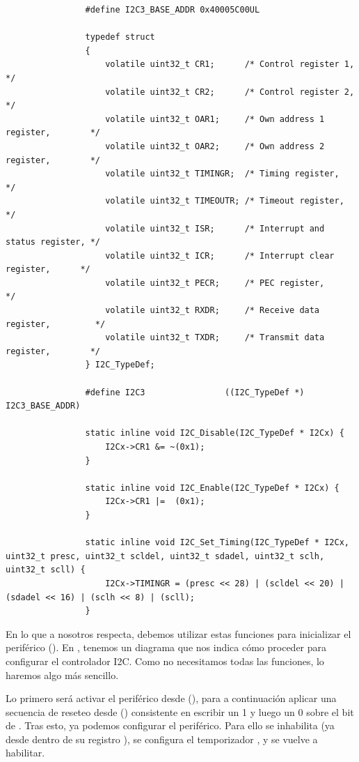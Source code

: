 \documentclass[../main.tex]{subfiles}
\begin{document}
            \begin{lstlisting}
                #define I2C3_BASE_ADDR 0x40005C00UL

                typedef struct
                {
                    volatile uint32_t CR1;      /* Control register 1,            */
                    volatile uint32_t CR2;      /* Control register 2,            */
                    volatile uint32_t OAR1;     /* Own address 1 register,        */
                    volatile uint32_t OAR2;     /* Own address 2 register,        */
                    volatile uint32_t TIMINGR;  /* Timing register,               */
                    volatile uint32_t TIMEOUTR; /* Timeout register,              */
                    volatile uint32_t ISR;      /* Interrupt and status register, */
                    volatile uint32_t ICR;      /* Interrupt clear register,      */
                    volatile uint32_t PECR;     /* PEC register,                  */
                    volatile uint32_t RXDR;     /* Receive data register,         */
                    volatile uint32_t TXDR;     /* Transmit data register,        */
                } I2C_TypeDef;

                #define I2C3				((I2C_TypeDef *) I2C3_BASE_ADDR)
                
                static inline void I2C_Disable(I2C_TypeDef * I2Cx) {
                    I2Cx->CR1 &= ~(0x1);
                }

                static inline void I2C_Enable(I2C_TypeDef * I2Cx) {
                    I2Cx->CR1 |=  (0x1);
                }

                static inline void I2C_Set_Timing(I2C_TypeDef * I2Cx, uint32_t presc, uint32_t scldel, uint32_t sdadel, uint32_t sclh, uint32_t scll) {
                    I2Cx->TIMINGR = (presc << 28) | (scldel << 20) | (sdadel << 16) | (sclh << 8) | (scll);
                }
            \end{lstlisting}

            En lo que a nosotros respecta, debemos utilizar estas funciones para inicializar el periférico  (). En \REFMAN[26.4.5], tenemos un diagrama que nos indica cómo proceder para configurar el controlador I2C. Como no necesitamos todas las funciones, lo haremos algo más sencillo. 

            Lo primero será activar el periférico  desde  (\REFMAN[5.3.13]), para a continuación aplicar una secuencia de reseteo desde  (\REFMAN[5.3.8]) consistente en escribir un 1 y luego un 0 sobre el bit de . Tras esto, ya podemos configurar el periférico. Para ello se inhabilita (ya desde dentro de su registro ), se configura el temporizador , y se vuelve a habilitar.
\end{document}

